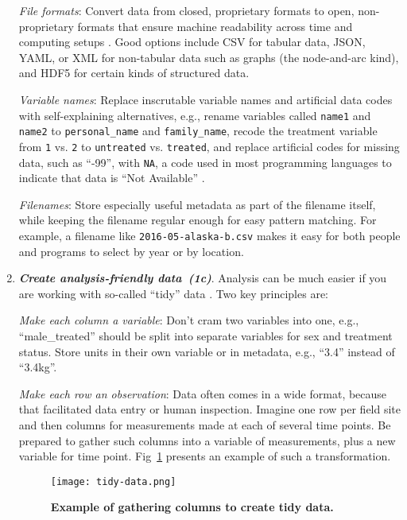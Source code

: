 \documentclass[10pt,letterpaper]{article}
\newcommand{\practice}[2]{\textbf{\emph{{#2}~({#1})}}}
\begin{document}
\begin{enumerate}
  \emph{File formats}: Convert data from closed, proprietary formats
  to open, non-proprietary formats that ensure machine readability
  across time and computing setups \cite{ffIllinois}. Good options
  include CSV for tabular data, JSON, YAML, or XML for non-tabular
  data such as graphs (the node-and-arc kind), and HDF5 for
  certain kinds of structured data.

  \emph{Variable names}: Replace inscrutable variable names and
  artificial data codes with self-explaining alternatives, e.g.,
  rename variables called \texttt{name1} and \texttt{name2} to
  \texttt{personal\_name} and \texttt{family\_name}, recode the
  treatment variable from \texttt{1} vs.  \texttt{2} to
  \texttt{untreated} vs. \texttt{treated}, and replace artificial
  codes for missing data, such as ``-99'', with \texttt{NA}, a code
  used in most programming languages to indicate that data is ``Not
  Available'' \cite{white2013}.

  \emph{Filenames}: Store especially useful metadata as part of the
  filename itself, while keeping the filename regular enough for easy
  pattern matching. For example, a filename like
  \texttt{2016-05-alaska-b.csv} makes it easy for both people and
  programs to select by year or by location.

\item

  \practice{1c}{Create analysis-friendly data}. Analysis can be much
  easier if you are working with so-called ``tidy'' data
  \cite{wickham2014}. Two key principles are:

  \emph{Make each column a variable}: Don't cram two variables into
  one, e.g., ``male\_treated'' should be split into separate variables
  for sex and treatment status.  Store units in their own variable or
  in metadata, e.g., ``3.4'' instead of ``3.4kg''.

  \emph{Make each row an observation}: Data often comes in a wide
  format, because that facilitated data entry or human
  inspection. Imagine one row per field site and then columns for
  measurements made at each of several time points. Be prepared to
  gather such columns into a variable of measurements, plus a new
  variable for time point.  Fig~\ref{fig:tidy} presents an example
  of such a transformation.

  \begin{figure}
   \texttt{[image: tidy-data.png]}
    \caption{\textbf{Example of gathering columns to create tidy data.}}
    \label{fig:tidy}
  \end{figure}


\end{enumerate}
\end{document}
